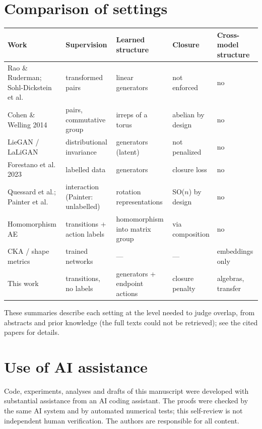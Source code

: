 \section{Comparison of settings}\label{app:novelty}
\begin{table}[ht]
\centering\scriptsize
\setlength{\tabcolsep}{3pt}
\begin{tabular}{p{2.9cm}p{2.6cm}p{2.3cm}p{2.0cm}p{1.9cm}}
\toprule
Work & Supervision & Learned structure & Closure & Cross-model structure\\
\midrule
Rao \& Ruderman; Sohl-Dickstein et al. & transformed pairs & linear generators & not enforced & no\\
Cohen \& Welling 2014 & pairs, commutative group & irreps of a torus & abelian by design & no\\
LieGAN / LaLiGAN & distributional invariance & generators (latent) & not penalized & no\\
Forestano et al. 2023 & labelled data & generators & closure loss & no\\
Quessard et al.; Painter et al. & interaction (Painter: unlabelled) & rotation representations & SO($n$) by design & no\\
Homomorphism AE & transitions + action labels & homomorphism into matrix group & via composition & no\\
CKA / shape metrics & trained networks & --- & --- & embeddings only\\
This work & transitions, no labels & generators + endpoint actions & closure penalty & algebras, transfer\\
\bottomrule
\end{tabular}
\end{table}
These summaries describe each setting at the level needed to judge overlap, from abstracts and prior knowledge (the full texts could not be retrieved); see the cited papers for details.



\section{Use of AI assistance}
Code, experiments, analyses and drafts of this manuscript were developed with substantial assistance from an AI
coding assistant. The proofs were checked by the same AI system and by automated numerical tests; this self-review is
not independent human verification. The authors are responsible for all content.
